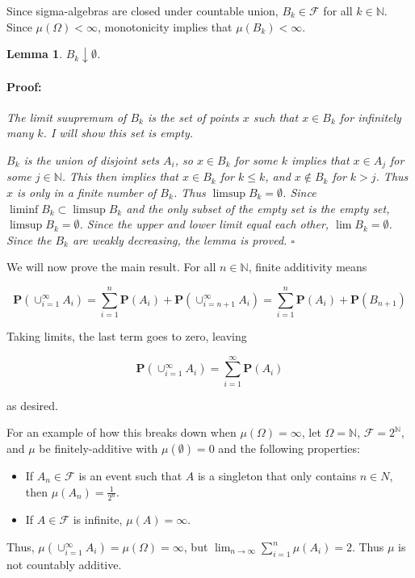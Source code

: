 \documentclass{article}
\newenvironment{proof}{\paragraph{Proof:}}{\hfill$\square$}
\newtheorem{lemma}[theorem]{Lemma}
\newcommand{\F}{\mathcal{F}}
\newcommand{\prob}{\boldsymbol{P}}
\newcommand{\N}{\mathbb{N}}
\begin{document}
Since sigma-algebras are closed under countable union, $B_k \in \F$ for all $k \in \N$. Since $\mu(\Omega) < \infty$, monotonicity implies that $\mu(B_k) < \infty$.

\begin{lemma}
$B_k \downarrow \emptyset$.

\begin{proof}
The limit suupremum of $B_k$ is the set of points $x$ such that $x \in B_k$ for infinitely many $k$. I will show this set is empty.

$B_k$ is the union of disjoint sets $A_i$, so $x \in B_k$ for some $k$ implies that $x \in A_j$ for some $j \in \N$. This then implies that $x \in B_k$ for $k \leq k$, and $x \not\in B_k$ for $k > j$. Thus $x$ is only in a finite number of $B_k$. Thus $\limsup B_k = \emptyset$. Since $\liminf B_k \subset \limsup B_k$ and the only subset of the empty set is the empty set, $\limsup B_k = \emptyset$. Since the upper and lower limit equal each other, $\lim B_k = \emptyset$. Since the $B_k$ are weakly decreasing, the lemma is proved.
\end{proof}
\end{lemma}

We will now prove the main result. For all $n \in \N$, finite additivity means

\[
\prob(\cup_{i=1}^\infty A_i) = \sum_{i=1}^n \prob(A_i) + \prob(\cup_{i=n+1}^\infty A_i) = \sum_{i=1}^n \prob(A_i) + \prob(B_{n+1})
\]

Taking limits, the last term goes to zero, leaving

\[
\prob(\cup_{i=1}^\infty A_i) = \sum_{i=1}^\infty \prob(A_i)
\]

as desired.

For an example of how this breaks down when $\mu(\Omega) = \infty$, let $\Omega = \N$, $\F = 2^\N$, and $\mu$ be finitely-additive with $\mu(\emptyset) = 0$ and the following properties:

\begin{itemize}
\item If $A_n \in \F$ is an event such that $A$ is a singleton that only contains $n \in N$, then $\mu(A_n) = \frac{1}{2^n}$.
\item If $A \in \F$ is infinite, $\mu(A) = \infty$.
\end{itemize}

Thus, $\mu(\cup_{i=1}^\infty A_i) = \mu(\Omega) = \infty$, but $\lim_{n \rightarrow \infty} \sum_{i=1}^n \mu(A_i) = 2$. Thus $\mu$ is not countably additive.
\end{document}
